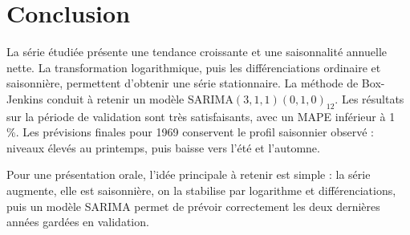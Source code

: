 \documentclass[12pt,a4paper]{article}
\begin{document}
\section{Conclusion}

La série étudiée présente une tendance croissante et une saisonnalité annuelle nette.
La transformation logarithmique, puis les différenciations ordinaire et saisonnière,
permettent d'obtenir une série stationnaire. La méthode de Box-Jenkins conduit à retenir
un modèle SARIMA$(3,1,1)(0,1,0)_{12}$. Les résultats sur la période de validation sont
très satisfaisants, avec un MAPE inférieur à 1 \%. Les prévisions finales pour 1969
conservent le profil saisonnier observé : niveaux élevés au printemps, puis baisse vers
l'été et l'automne.

Pour une présentation orale, l'idée principale à retenir est simple : la série augmente,
elle est saisonnière, on la stabilise par logarithme et différenciations, puis un modèle
SARIMA permet de prévoir correctement les deux dernières années gardées en validation.
\end{document}

